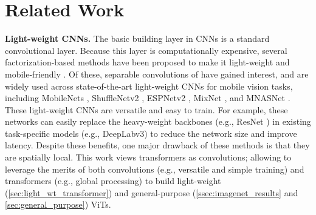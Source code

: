 \documentclass[preprint]{article} \usepackage{iclr2022_conference,times}
\begin{document}
\section{Related Work}
\label{sec:related_work}

\textbf{Light-weight CNNs.} The basic building layer in CNNs is a standard convolutional layer. Because this layer is computationally expensive, several factorization-based methods have been proposed to make it light-weight and mobile-friendly \citep[e.g.,][]{jin2014flattened, chollet2017xception, mehta2020dicenet}. Of these, separable convolutions of \citet{chollet2017xception} have gained interest, and are widely used across state-of-the-art light-weight CNNs for mobile vision tasks, including MobileNets \citep{howard2017mobilenets, sandler2018mobilenetv2, howard2019searching}, ShuffleNetv2 \citep{ma2018shufflenet}, ESPNetv2 \citep{mehta2019espnetv2}, MixNet \citep{tan2019mixconv}, and MNASNet \citep{tan2019mnasnet}. These light-weight CNNs are versatile and easy to train. For example, these networks can easily replace the heavy-weight backbones (e.g., ResNet \citep{he2016deep}) in existing task-specific models (e.g., DeepLabv3) to reduce the network size and improve latency. Despite these benefits, one major drawback of these methods is that they are spatially local. This work views transformers as convolutions; allowing to leverage the merits of both convolutions (e.g., versatile and simple training) and transformers (e.g., global processing) to build light-weight (\textsection \ref{sec:light_wt_transformer}) and general-purpose (\textsection \ref{ssec:imagenet_results} and \textsection \ref{sec:general_purpose}) ViTs.
\end{document}
